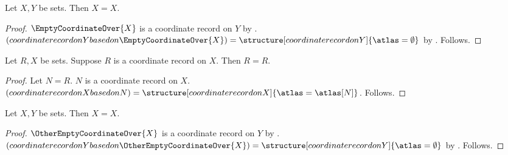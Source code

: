 

\begin{proposition}\label{discovery_explicit_parameter}
    Let $X,Y$ be sets.
    Then $X=X$.
\end{proposition}
\begin{proof}
    $\EmptyCoordinateOver{X}$ is a coordinate record on $Y$
        by .
    $(coordinate record on Y based on \EmptyCoordinateOver{X})=
        \structure[coordinate record on Y]{\atlas=\emptyset}$
        by .
    Follows.
\end{proof}

\begin{proposition}\label{discovery_explicit_alias}
    Let $R,X$ be sets.
    Suppose $R$ is a coordinate record on $X$.
    Then $R=R$.
\end{proposition}
\begin{proof}
    Let $N=R$.
    $N$ is a coordinate record on $X$.
    $(coordinate record on X based on N)=
        \structure[coordinate record on X]{\atlas=\atlas[N]}$.
    Follows.
\end{proof}

\begin{proposition}\label{discovery_explicit_other_provider}
    Let $X,Y$ be sets.
    Then $X=X$.
\end{proposition}
\begin{proof}
    $\OtherEmptyCoordinateOver{X}$ is a coordinate record on $Y$
        by .
    $(coordinate record on Y based on \OtherEmptyCoordinateOver{X})=
        \structure[coordinate record on Y]{\atlas=\emptyset}$
        by .
    Follows.
\end{proof}
